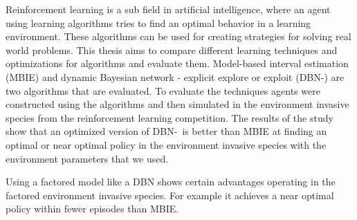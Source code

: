 
Reinforcement learning is a sub field in artificial intelligence, 
where an agent using learning algorithms tries to find an optimal behavior in a learning environment. %
These algorithms can be used for creating strategies for solving real world problems. 
This thesis aims to compare different learning techniques and optimizations for algorithms and evaluate them. 
Model-based interval estimation (MBIE) and dynamic Bayesian network - explicit explore or exploit (DBN-\etre)
 are two algorithms that are evaluated. 
To evaluate the techniques agents were constructed using the algorithms and 
then simulated in the environment invasive species from the reinforcement learning competition.
The results of the study show that an optimized version of DBN-\etre\ is better than MBIE at finding an optimal or near optimal policy in the 
environment invasive species with the environment parameters that we used.

Using a factored model like a DBN shows certain advantages operating in 
the factored environment invasive species. For example it achieves a near optimal
policy within fewer episodes than MBIE.





